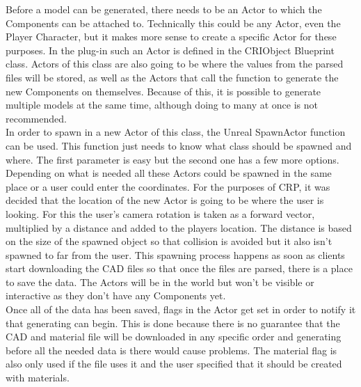 Before a model can be generated, there needs to be an Actor to which the Components can be attached to. Technically this could be any Actor, even the Player Character, but it makes more sense to create a specific Actor for these purposes. In the plug-in such an Actor is defined in the CRIObject Blueprint class. Actors of this class are also going to be where the values from the parsed files will be stored, as well as the Actors that call the function to generate the new Components on themselves. Because of this, it is possible to generate multiple models at the same time, although doing to many at once is not recommended.\\
In order to spawn in a new Actor of this class, the Unreal SpawnActor function can be used. This function just needs to know what class should be spawned and where. The first parameter is easy but the second one has a few more options. Depending on what is needed all these Actors could be spawned in the same place or a user could enter the coordinates. For the purposes of \acs{CRP}, it was decided that the location of the new Actor is going to be where the user is looking. For this the user's camera rotation is taken as a forward vector, multiplied by a distance and added to the players location. The distance is based on the size of the spawned object so that collision is avoided but it also isn't spawned to far from the user. This spawning process happens as soon as clients start downloading the \acs{CAD} files so that once the files are parsed, there is a place to save the data. The Actors will be in the world but won't be visible or interactive as they don't have any Components yet.\\
Once all of the data has been saved, flags in the Actor get set in order to notify it that generating can begin. This is done because there is no guarantee that the \acs{CAD} and material file will be downloaded in any specific order and generating before all the needed data is there would cause problems. The material flag is also only used if the file uses it and the user specified that it should be created with materials.\\
